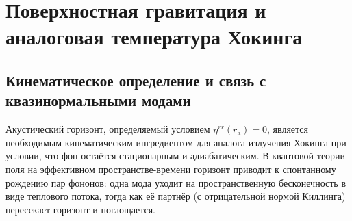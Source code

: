 \documentclass[12pt,a4paper,preprint]{elsarticle}
\begin{document}
    \section{Поверхностная гравитация и аналоговая температура Хокинга}\label{sec:surface-gravity}

        \subsection{Кинематическое определение и связь с квазинормальными модами}\label{subsec:kinematic-definition}
            Акустический горизонт, определяемый условием $\eta^{rr}(r_{\mathrm{a}})=0$, является необходимым кинематическим ингредиентом для аналога излучения Хокинга при условии, что фон остаётся стационарным и адиабатическим. В квантовой теории поля на эффективном пространстве-времени горизонт приводит к спонтанному рождению пар фононов: одна мода уходит на пространственную бесконечность в виде теплового потока, тогда как её партнёр (с отрицательной нормой Киллинга) пересекает горизонт и поглощается.
\end{document}
